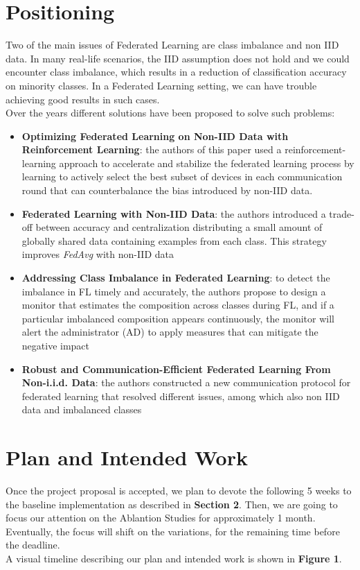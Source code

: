\documentclass{article}
\begin{document}
\section{Positioning}
Two of the main issues of Federated Learning are class imbalance and non IID data\cite{ZHANG2021106775}. 
In many real-life scenarios, the IID assumption does not hold and we could encounter class imbalance, which results in a reduction of classification accuracy on minority classes. In a Federated Learning setting, we can have trouble achieving good results in such cases.\\
Over the years different solutions have been proposed to solve such problems:
\begin{itemize}
  \item \textbf{Optimizing Federated Learning on Non-IID Data
with Reinforcement Learning}\cite{9155494}: the authors of this paper used a reinforcement-learning approach to accelerate and stabilize the federated learning process by learning to actively select the best subset of devices in each communication round that can counterbalance the bias introduced by non-IID data.
  \item \textbf{Federated Learning with Non-IID Data}\cite{DBLP:journals/corr/abs-1806-00582}: the authors introduced a trade-off between accuracy and centralization distributing a small amount of globally shared data containing examples from each class. This strategy improves \emph{FedAvg} with non-IID data
  \item \textbf{Addressing Class Imbalance in Federated Learning}\cite{DBLP:journals/corr/abs-2008-06217}: to detect the imbalance in FL timely and accurately, the authors propose to design a monitor that estimates the composition across classes during FL, and if a particular imbalanced composition appears continuously, the monitor will alert the administrator (AD) to apply measures that can mitigate the negative impact
  \item \textbf{Robust and Communication-Efficient Federated Learning From Non-i.i.d. Data}\cite{DBLP:journals/corr/abs-1903-02891}: the authors constructed a new communication protocol for federated learning that resolved different issues, among which also non IID data and imbalanced classes
\end{itemize}


\section{Plan and Intended Work}
Once the project proposal is accepted, we plan to devote the following 5 weeks to the baseline implementation as described in \textbf{Section 2}. Then, we are going to focus our attention on the Ablantion Studies for approximately 1 month. Eventually, the focus will shift on the variations, for the remaining time before the deadline.\\ 
A visual timeline describing our plan and intended work is shown in \textbf{Figure 1}.
\end{document}
